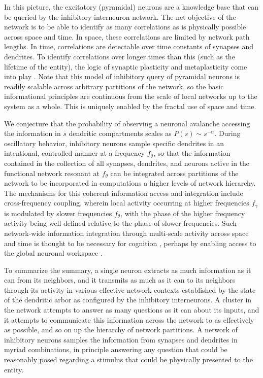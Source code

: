\documentclass[twocolumn]{article}
\begin{document}
In this picture, the excitatory (pyramidal) neurons are a knowledge base that can be queried by the inhibitory interneuron network. The net objective of the network is to be able to identify as many correlations as is physically possible across space and time. In space, these correlations are limited by network path lengths. In time, correlations are detectable over time constants of synapses and dendrites. To identify correlations over longer times than this (such as the lifetime of the entity), the logic of synaptic plasticity and metaplasticity come into play \cite{fudr2005,fuab2007}. Note that this model of inhibitory query of pyramidal neurons is readily scalable across arbitrary partitions of the network, so the basic informational principles are continuous from the scale of local networks up to the system as a whole. This is uniquely enabled by the fractal use of space and time.

We conjecture that the probability of observing a neuronal avalanche accessing the information in $s$ dendritic compartments scales as $P(s)\sim s^{-\alpha}$. During oscillatory behavior, inhibitory neurons sample specific dendrites in an intentional, controlled manner at a frequency $f_{\theta}$, so that the information contained in the collection of all synapses, dendrites, and neurons active in the functional network resonant at $f_{\theta}$ can be integrated across partitions of the network to be incorporated in computations a higher levels of network hierarchy. The mechanisms for this coherent information access and integration include cross-frequency coupling, wherein local activity occurring at higher frequencies $f_{\gamma}$ is modulated by slower frequencies $f_{\theta}$, with the phase of the higher frequency activity being well-defined relative to the phase of slower frequencies. Such network-wide information integration through multi-scale activity across space and time is thought to be necessary for cognition \cite{bu2006}, perhaps by enabling access to the global neuronal workspace \cite{ba1988,de2014}.

To summarize the summary, a single neuron extracts as much information as it can from its neighbors, and it transmits as much as it can to its neighbors through its activity in various effective network contexts established by the state of the dendritic arbor as configured by the inhibitory interneurons. A cluster in the network attempts to answer as many questions as it can about its inputs, and it attempts to communicate this information across the network to as effectively as possible, and so on up the hierarchy of network partitions. A network of inhibitory neurons samples the information from synapses and dendrites in myriad combinations, in principle answering any question that could be reasonably posed regarding a stimulus that could be physically presented to the entity. 
\end{document}

